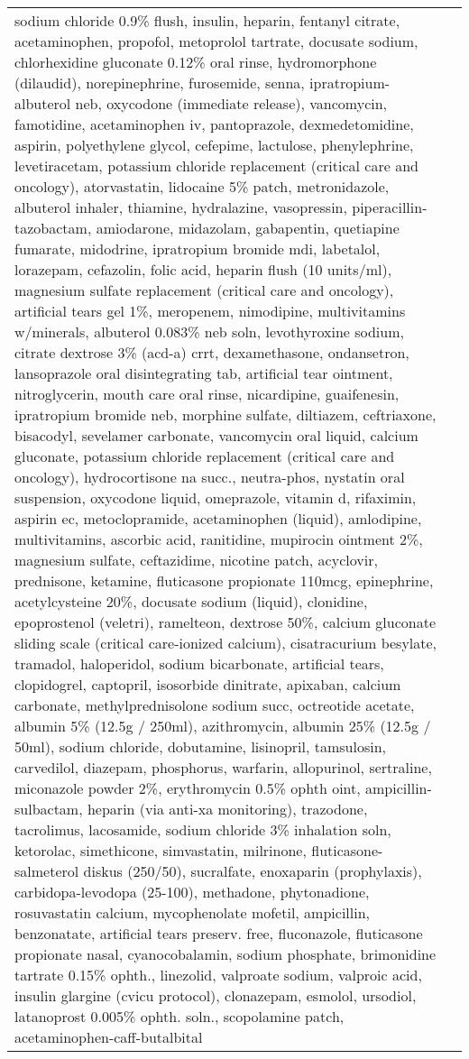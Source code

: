 \begin{table*}[h]
{\begin{tabularx}{\textwidth}{lX}
            sodium chloride 0.9\% flush, insulin, heparin, fentanyl citrate, acetaminophen, propofol, metoprolol tartrate, docusate sodium, chlorhexidine gluconate 0.12\% oral rinse, hydromorphone (dilaudid), norepinephrine, furosemide, senna, ipratropium-albuterol neb, oxycodone (immediate release), vancomycin, famotidine, acetaminophen iv, pantoprazole, dexmedetomidine, aspirin, polyethylene glycol, cefepime, lactulose, phenylephrine, levetiracetam, potassium chloride replacement (critical care and oncology), atorvastatin, lidocaine 5\% patch, metronidazole, albuterol inhaler, thiamine, hydralazine, vasopressin, piperacillin-tazobactam, amiodarone, midazolam, gabapentin, quetiapine fumarate, midodrine, ipratropium bromide mdi, labetalol, lorazepam, cefazolin, folic acid, heparin flush (10 units/ml), magnesium sulfate replacement (critical care and oncology), artificial tears gel 1\%, meropenem, nimodipine, multivitamins w/minerals, albuterol 0.083\% neb soln, levothyroxine sodium, citrate dextrose 3\% (acd-a) crrt, dexamethasone, ondansetron, lansoprazole oral disintegrating tab, artificial tear ointment, nitroglycerin, mouth care oral rinse, nicardipine, guaifenesin, ipratropium bromide neb, morphine sulfate, diltiazem, ceftriaxone, bisacodyl, sevelamer carbonate, vancomycin oral liquid, calcium gluconate, potassium chloride replacement (critical care and oncology), hydrocortisone na succ., neutra-phos, nystatin oral suspension, oxycodone liquid, omeprazole, vitamin d, rifaximin, aspirin ec, metoclopramide, acetaminophen (liquid), amlodipine, multivitamins, ascorbic acid, ranitidine, mupirocin ointment 2\%, magnesium sulfate, ceftazidime, nicotine patch, acyclovir, prednisone, ketamine, fluticasone propionate 110mcg, epinephrine, acetylcysteine 20\%, docusate sodium (liquid), clonidine, epoprostenol (veletri), ramelteon, dextrose 50\%, calcium gluconate sliding scale (critical care-ionized calcium), cisatracurium besylate, tramadol, haloperidol, sodium bicarbonate, artificial tears, clopidogrel, captopril, isosorbide dinitrate, apixaban, calcium carbonate, methylprednisolone sodium succ, octreotide acetate, albumin 5\% (12.5g / 250ml), azithromycin, albumin 25\% (12.5g / 50ml), sodium chloride, dobutamine, lisinopril, tamsulosin, carvedilol, diazepam, phosphorus, warfarin, allopurinol, sertraline, miconazole powder 2\%, erythromycin 0.5\% ophth oint, ampicillin-sulbactam, heparin (via anti-xa monitoring), trazodone, tacrolimus, lacosamide, sodium chloride 3\% inhalation soln, ketorolac, simethicone, simvastatin, milrinone, fluticasone-salmeterol diskus (250/50), sucralfate, enoxaparin (prophylaxis), carbidopa-levodopa (25-100), methadone, phytonadione, rosuvastatin calcium, mycophenolate mofetil, ampicillin, benzonatate, artificial tears preserv. free, fluconazole, fluticasone propionate nasal, cyanocobalamin, sodium phosphate, brimonidine tartrate 0.15\% ophth., linezolid, valproate sodium, valproic acid, insulin glargine (cvicu protocol), clonazepam, esmolol, ursodiol, latanoprost 0.005\% ophth. soln., scopolamine patch, acetaminophen-caff-butalbital \\ 

\end{tabularx}}
\end{table*}

